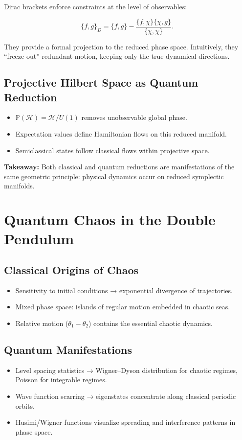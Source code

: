 \documentclass[11pt]{book}
\begin{document}
Dirac brackets enforce constraints at the level of observables:

\[
\{f,g\}_D = \{f,g\} - \frac{\{f,\chi\}\{\chi,g\}}{\{\chi,\chi\}}.
\]

They provide a formal projection to the reduced phase space. Intuitively, they “freeze out” redundant motion, keeping only the true dynamical directions.

\section{Projective Hilbert Space as Quantum Reduction}
\begin{itemize}
   \item
 $\mathbb{P}(\mathcal{H}) = \mathcal{H}/U(1)$ removes unobservable global phase.  
   \item
 Expectation values define Hamiltonian flows on this reduced manifold.  
   \item
 Semiclassical states follow classical flows within projective space.  
\end{itemize}

\textbf{Takeaway:} Both classical and quantum reductions are manifestations of the 
same geometric principle: physical dynamics occur on reduced symplectic manifolds.


\chapter{Quantum Chaos in the Double Pendulum}

\section{Classical Origins of Chaos}
\begin{itemize}
   \item
 Sensitivity to initial conditions → exponential divergence of trajectories.  
   \item
 Mixed phase space: islands of regular motion embedded in chaotic seas.  
   \item
 Relative motion ($\theta_1 - \theta_2$) contains the essential chaotic dynamics.
\end{itemize}

\section{Quantum Manifestations}
\begin{itemize}
   \item
 Level spacing statistics → Wigner–Dyson distribution for chaotic regimes, 
        Poisson for integrable regimes.  
   \item
       Wave function scarring → eigenstates concentrate along classical periodic orbits.  
   \item
 Husimi/Wigner functions visualize spreading and interference patterns in phase space.  
\end{itemize}
\end{document}

